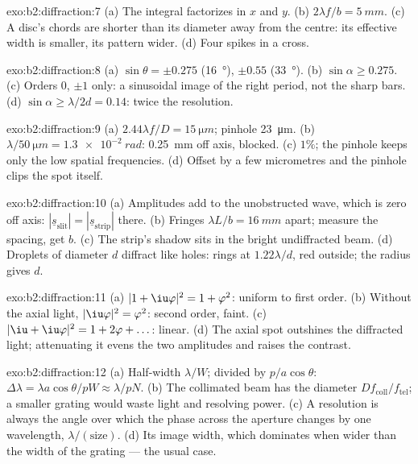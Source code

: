 \begin{solution}{exo:b2:diffraction:7}
(a) The integral factorizes in $x$ and $y$. (b) $2\lambda f/b = \qty{5}{mm}$. (c) A
disc's chords are shorter than its diameter away from the centre: its
effective width is smaller, its pattern wider. (d) Four 
spikes in a cross.
\end{solution}

\begin{solution}{exo:b2:diffraction:8}
(a) $\sin\theta = \pm0.275$ (\qty{16}{\degree}), $\pm0.55$ (\qty{33}{\degree}). (b) $\sin\alpha \ge 0.275$.
(c) Orders $0$, $\pm1$ only: a sinusoidal image of the right period, not
the sharp bars. (d) $\sin\alpha \ge \lambda/2d = 0.14$: twice the resolution.
\end{solution}

\begin{solution}{exo:b2:diffraction:9}
(a) $2.44\lambda f/D = \qty{15}{\micro m}$; pinhole \qty{23}{\micro m}. (b) $\lambda/\qty{50}{\micro m} =
\qty{1.3e-2}{rad}$: \qty{0.25}{mm} off axis, blocked. (c) $1\%$; the pinhole keeps only
the low spatial frequencies. (d) Offset by a few micrometres and the
pinhole clips the spot itself.
\end{solution}

\begin{solution}{exo:b2:diffraction:10}
(a) Amplitudes add to the unobstructed wave, which is zero off axis:
$|\underline s_{\text{slit}}| = |\underline s_{\text{strip}}|$ there. (b) Fringes $\lambda L/b =
\qty{16}{mm}$ apart; measure the spacing, get $b$. (c) The strip's shadow sits
in the bright undiffracted beam. (d) Droplets of diameter $d$ diffract
like holes: rings at $1.22\lambda/d$, red outside; the radius gives $d$.
\end{solution}

\begin{solution}{exo:b2:diffraction:11}
(a) $|1 + \iu\varphi|^2 = 1 + \varphi^2$: uniform to first order. (b) Without the
axial light, $|\iu\varphi|^2 = \varphi^2$: second order, faint. (c) $|\iu + \iu\varphi|^2 =
1 + 2\varphi + \dots$: linear. (d) The axial spot outshines the diffracted
light; attenuating it evens the two amplitudes and raises the contrast.
\end{solution}

\begin{solution}{exo:b2:diffraction:12}
(a) Half-width $\lambda/W$; divided by $p/a\cos\theta$: $\Delta\lambda = \lambda a\cos\theta/pW \approx
\lambda/pN$. (b) The collimated beam has the diameter $Df_{\text{coll}}/f_{\text{tel}}$;
a smaller grating would waste light and resolving power. (c) A
resolution is always the angle over which the phase across the
aperture changes by one wavelength, $\lambda/(\text{size})$. (d) Its image
width, which dominates when wider than the  width of the
grating --- the usual case.
\end{solution}

